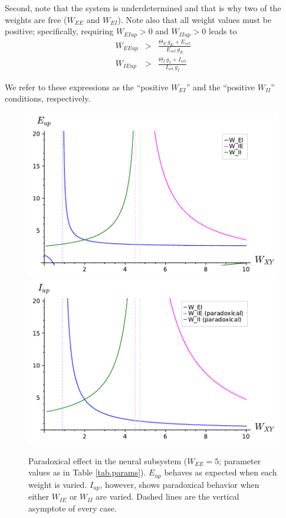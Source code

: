 \documentclass[
twocolumn,
]{article}
\newcommand{\EE}{\mathit{EE}}
\newcommand{\EI}{\mathit{EI}}
\newcommand{\IE}{\mathit{IE}}
\newcommand{\II}{\mathit{II}}
\newcommand{\set}{\mathit{set}}
\newcommand{\up}{\mathit{up}}
\begin{document}
Second, note that the system is underdetermined and that is why two of the weights are free ($W_{\EE}$ and $W_{\EI}$). Note also that all weight values must be positive; specifically, requiring $W_{\EI\up}>0$ and $W_{\II\up}>0$ leads to
\begin{eqnarray}
W_{\EE\up} & > & \frac{\Theta_E \, g_E + E_{\set}}{E_{\set} \, g_E}
\label{eq.positive_WEI} \\
W_{\IE\up} & > & \frac{\Theta_I \, g_I + I_{\set}}{I_{\set} \, g_I}
\label{eq.positive_WII}
\end{eqnarray}

\noindent We refer to these expressions as the ``positive $W_{\EI}$'' and the ``positive $W_{\II}$'' conditions, respectively.



\begin{figure}[!ht]
\centering
\includegraphics[width=\linewidth]{paradoxical_E}
\includegraphics[width=\linewidth]{paradoxical_I}
\caption{Paradoxical effect in the neural subsystem ($W_{\EE}=5$; parameter values as in Table \ref{tab.params}). $E_{\up}$ behaves as expected when each weight is varied. $I_{\up}$, however, shows paradoxical behavior when either $W_{\IE}$ or $W_{\II}$ are varied. Dashed lines are the vertical asymptote of every case.}
\label{fig.paradoxical}
\end{figure}
\end{document}
